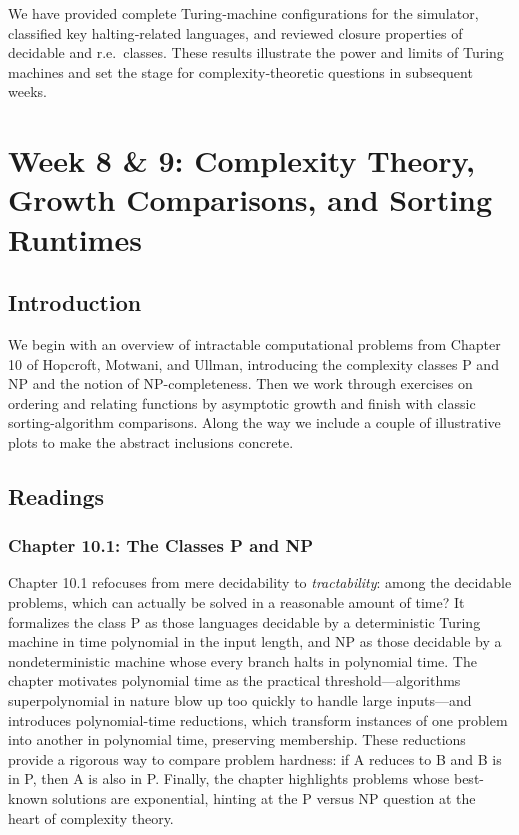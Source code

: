 \documentclass{article}
\theoremstyle{theorem}
\theoremstyle{definition}
\theoremstyle{remark}
\begin{document}
We have provided complete Turing‐machine configurations for the simulator, classified key halting‐related languages, and reviewed closure properties of decidable and r.e.\ classes.  These results illustrate the power and limits of Turing machines and set the stage for complexity‐theoretic questions in subsequent weeks.

\newpage

\section{Week 8 \& 9: Complexity Theory, Growth Comparisons, and Sorting Runtimes}

\subsection{Introduction}
We begin with an overview of intractable computational problems from Chapter 10 of Hopcroft, Motwani, and Ullman, introducing the complexity classes P and NP and the notion of NP-completeness. Then we work through exercises on ordering and relating functions by asymptotic growth and finish with classic sorting-algorithm comparisons. Along the way we include a couple of illustrative plots to make the abstract inclusions concrete.

\subsection{Readings}
\subsubsection*{Chapter 10.1: The Classes P and NP}
Chapter 10.1 refocuses from mere decidability to \emph{tractability}: among the decidable problems, which can actually be solved in a reasonable amount of time? It formalizes the class P as those languages decidable by a deterministic Turing machine in time polynomial in the input length, and NP as those decidable by a nondeterministic machine whose every branch halts in polynomial time. The chapter motivates polynomial time as the practical threshold—algorithms superpolynomial in nature blow up too quickly to handle large inputs—and introduces polynomial-time reductions, which transform instances of one problem into another in polynomial time, preserving membership. These reductions provide a rigorous way to compare problem hardness: if A reduces to B and B is in P, then A is also in P. Finally, the chapter highlights problems whose best-known solutions are exponential, hinting at the P versus NP question at the heart of complexity theory.
\end{document}
